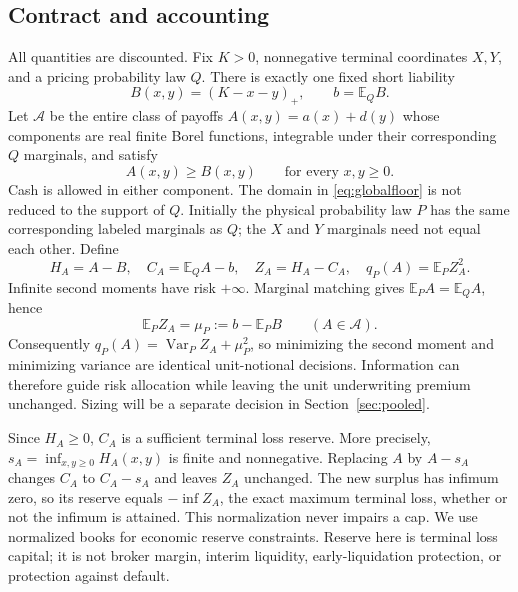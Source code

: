 \documentclass[11pt,a4paper]{amsart}
\theoremstyle{plain}
\theoremstyle{definition}
\theoremstyle{remark}
\DeclareMathOperator{\Var}{Var}
\newcommand{\EE}{\mathbb{E}}
\newcommand{\calA}{\mathcal{A}}
\begin{document}
\subsection{Contract and accounting}
All quantities are discounted. Fix $K>0$, nonnegative terminal coordinates $X,Y$, and a pricing probability law $Q$. There is exactly one fixed short liability
\begin{equation}\label{eq:basket}
 B(x,y)=(K-x-y)_+,\qquad b=\EE_Q B.
\end{equation}
Let $\calA$ be the entire class of payoffs $A(x,y)=a(x)+d(y)$ whose components are real finite Borel functions, integrable under their corresponding $Q$ marginals, and satisfy
\begin{equation}\label{eq:globalfloor}
 A(x,y)\ge B(x,y)\qquad\text{for every }x,y\ge0.
\end{equation}
Cash is allowed in either component. The domain in \eqref{eq:globalfloor} is not reduced to the support of $Q$. Initially the physical probability law $P$ has the same corresponding labeled marginals as $Q$; the $X$ and $Y$ marginals need not equal each other. Define
\begin{equation}\label{eq:accounting}
 H_A=A-B,\quad C_A=\EE_Q A-b,\quad Z_A=H_A-C_A,
 \quad q_P(A)=\EE_P Z_A^2.
\end{equation}
Infinite second moments have risk $+\infty$. Marginal matching gives $\EE_P A=\EE_Q A$, hence
\begin{equation}\label{eq:unitmean}
 \EE_P Z_A=\mu_P:=b-\EE_P B
 \qquad(A\in\calA).
\end{equation}
Consequently $q_P(A)=\Var_P Z_A+\mu_P^2$, so minimizing the second moment and minimizing variance are identical unit-notional decisions. Information can therefore guide risk allocation while leaving the unit underwriting premium unchanged. Sizing will be a separate decision in Section~\ref{sec:pooled}.

Since $H_A\ge0$, $C_A$ is a sufficient terminal loss reserve. More precisely, $s_A=\inf_{x,y\ge0}H_A(x,y)$ is finite and nonnegative. Replacing $A$ by $A-s_A$ changes $C_A$ to $C_A-s_A$ and leaves $Z_A$ unchanged. The new surplus has infimum zero, so its reserve equals $-\inf Z_A$, the exact maximum terminal loss, whether or not the infimum is attained. This normalization never impairs a cap. We use normalized books for economic reserve constraints. Reserve here is terminal loss capital; it is not broker margin, interim liquidity, early-liquidation protection, or protection against default.
\end{document}
